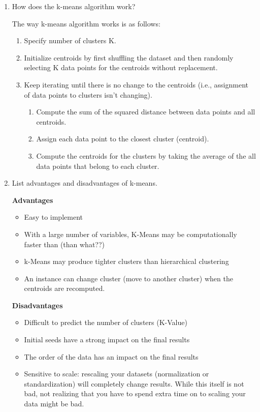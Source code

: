 \documentclass[12pt]{article}
\newenvironment{QandA}{\begin{enumerate}[label=\bfseries\arabic*.]\bfseries}
{\end{enumerate}}
\newenvironment{answered}{\par\normalfont\color{Sepia}}{}
\begin{document}
\begin{QandA}
    \item How does the k-means algorithm work?
    \begin{answered}
        The way k-means algorithm works is as follows:
        \begin{enumerate}
            \item Specify number of clusters K.
            \item Initialize centroids by first shuffling the dataset and then randomly selecting K data points for the centroids without replacement.
            \item Keep iterating until there is no change to the centroids (i.e., assignment of data points to clusters isn’t changing).
            \begin{enumerate}
                \item Compute the sum of the squared distance between data points and all centroids.
                \item Assign each data point to the closest cluster (centroid).
                \item Compute the centroids for the clusters by taking the average of the all data points that belong to each cluster.
            \end{enumerate}
        \end{enumerate}
    \end{answered}

    \item List advantages and disadvantages of k-means.
    \begin{answered}
        \textbf{Advantages} 
        \begin{itemize}
            \item  Easy to implement
            \item With a large number of variables, K-Means may be computationally faster than (than what??)
            \item k-Means may produce tighter clusters than hierarchical clustering
            \item An instance can change cluster (move to another cluster) when the centroids are recomputed. 
        \end{itemize}   
        
        \textbf{Disadvantages}
        \begin{itemize}
            \item Difficult to predict the number of clusters (K-Value)
            \item Initial seeds have a strong impact on the final results
            \item The order of the data has an impact on the final results
            \item Sensitive to scale: rescaling your datasets (normalization or standardization) will completely change results. While this itself is not bad, not realizing that you have to spend extra time on to scaling your data might be bad. 
        \end{itemize}   
    \end{answered}
\end{QandA}
\end{document}
